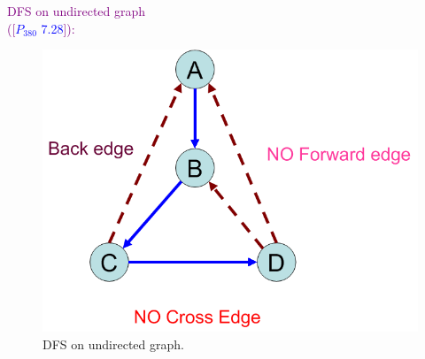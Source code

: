 \begin{frame}
\begin{columns}
    \begin{column}{0.50\textwidth}
      \textcolor{purple}{DFS on undirected graph  \\ ([\textcolor{blue}{$P_{380}$ 7.28}]):}
      \begin{figure}
        \includegraphics[scale=0.30]{figure/bfs_dfs/dfsundirected}
        \caption{{\scriptsize DFS on undirected graph.}}
        \label{fig:dfsundirected}
      \end{figure}
    \end{column}
  \end{columns}
      
\end{frame}


